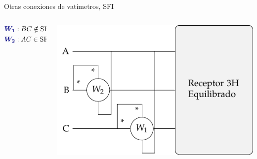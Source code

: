 \documentclass[aspectratio=169, usenames,svgnames,dvipsnames]{beamer}
\begin{document}
\begin{frame}{Otras conexiones de vatímetros, \hspace{3mm}SFI}
\begin{columns}
\begin{column}{0.33\columnwidth}
        \vspace{-8mm}
        \begin{align*}
          {\boldsymbol{\color{blue!50!black} W_1}}&: BC \notin \text{SFI}\\
          {\boldsymbol{\color{blue!50!black} W_2}}&: AC \in \text{SFI}\\
        \end{align*}
    \end{column}
    \begin{column}{0.33\columnwidth}
        \begin{center}
            \includegraphics[width=1\linewidth]{../figs/Potencia3H_Equilibrado_BC_SFI.pdf}
        \end{center}
        

\end{column}
\end{columns}
\end{frame}
\end{document}
